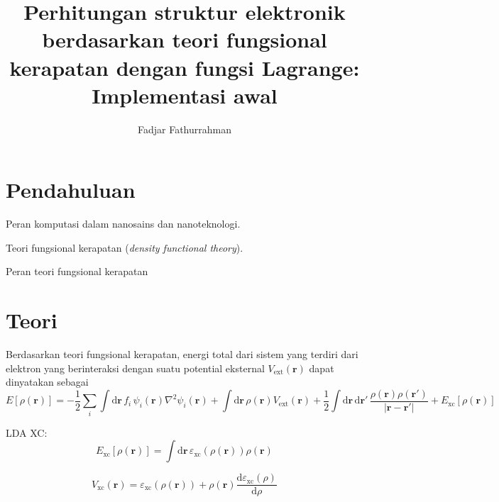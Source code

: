 \documentclass[11pt]{article}
\begin{document}
\title{Perhitungan struktur elektronik berdasarkan teori fungsional
    kerapatan dengan fungsi Lagrange: Implementasi awal}
\author{Fadjar Fathurrahman}
\date{}
\maketitle

\section{Pendahuluan}

Peran komputasi dalam nanosains dan nanoteknologi.

Teori fungsional kerapatan (\emph{density functional theory}).

Peran teori fungsional kerapatan

\section{Teori}

Berdasarkan teori fungsional kerapatan,
energi total dari sistem yang terdiri dari elektron yang berinteraksi
dengan suatu potential eksternal $V_{\mathrm{ext}}(\mathbf{r})$
dapat dinyatakan sebagai
\begin{equation}
E[\rho(\mathbf{r})] = 
-\frac{1}{2}\sum_{i}
\int\mathrm{d}\mathbf{r}\,
f_{i} \, \psi_{i}(\mathbf{r}) \nabla^2 \psi_{i}(\mathbf{r}) +
\int\mathrm{d}\mathbf{r}\,
\rho(\mathbf{r}) V_{\mathrm{ext}}(\mathbf{r}) +
\frac{1}{2}\int\mathrm{d}\mathbf{r}\,\mathrm{d}\mathbf{r}'\,
\frac{\rho(\mathbf{r})\rho(\mathbf{r}')}{\left|\mathbf{r}-\mathbf{r}'\right|} +
E_{\mathrm{xc}}[\rho(\mathbf{r})]
\end{equation}

LDA XC:
\begin{equation}
E_{\mathrm{xc}}[\rho(\mathbf{r})] =
\int\mathrm{d}\mathbf{r}\,
\varepsilon_{\mathrm{xc}}(\rho(\mathbf{r}))
\rho(\mathbf{r})
\end{equation}

\begin{equation}
V_{\mathrm{xc}}(\mathbf{r}) = \varepsilon_{\mathrm{xc}}(\rho(\mathbf{r}))
+ \rho(\mathbf{r})\frac{\mathrm{d}\varepsilon_{\mathrm{xc}}(\rho)}{\mathrm{d}\rho}
\end{equation}
\end{document}
